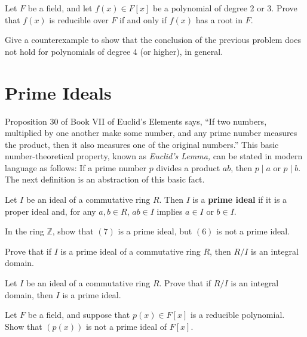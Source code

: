 \begin{problem}
Let \(F\) be a field, and let \(f(x)\in F[x]\) be a polynomial of degree 2 or 3. Prove that \(f(x)\) is reducible over \(F\) if and only if \(f(x)\) has a root in \(F\).
\end{problem}

\begin{problem}
Give a counterexample to show that the conclusion of the previous problem does not hold for polynomials of degree 4 (or higher), in general.
\end{problem}

\section{Prime Ideals}
Proposition 30 of Book VII of Euclid's Elements says, ``If two numbers, multiplied by one another make some number, and any prime number measures the product, then it also measures one of the original numbers.'' This basic number-theoretical property, known as \emph{Euclid's Lemma,} can be stated in modern language as follows: If a prime number \(p\) divides a product \(ab\), then \(p\mid a\) or \(p \mid b\). The next definition is an abstraction of this basic fact.

\begin{definition}
Let \(I\) be an ideal of a commutative ring \(R\). Then \(I\) is a \textbf{prime ideal} if it is a proper ideal and, for any \(a,b\in R\), \(ab \in I\) implies \(a \in I\) or \(b \in I\).
\end{definition}

\begin{problem}
In the ring \(\mathbb{Z}\), show that \((7)\) is a prime ideal, but \((6)\) is not a prime ideal.
\end{problem}

\begin{problem}
Prove that if \(I\) is a prime ideal of a commutative ring \(R\), then \(R/I\) is an integral domain.
\end{problem}

\begin{problem}
Let \(I\) be an ideal of a commutative ring \(R\). Prove that if \(R/I\) is an integral domain, then \(I\) is a prime ideal.
\end{problem}

\begin{problem}
Let \(F\) be a field, and suppose that \(p(x) \in F[x]\) is a reducible polynomial. Show that \((p(x))\) is not a prime ideal of \(F[x]\).
\end{problem}

